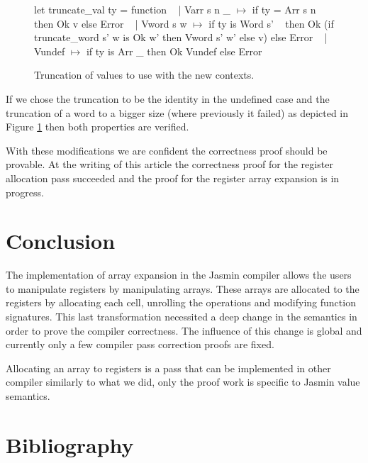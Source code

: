 \documentclass{article}
\begin{document}

\begin{figure}[t]
\obeylines\obeyspaces\ttfamily%
let truncate\_val ty = function
~ | Varr s n \_ \(\mapsto\) if ty = Arr s n then Ok v else Error
~ | Vword s w  \(\mapsto\) if ty is Word s'
~   then Ok (if truncate\_word s' w is Ok w' then Vword s' w' else v) else Error
~ | Vundef     \(\mapsto\) if ty is Arr \_ then Ok Vundef else Error
\normalfont%
\caption{Truncation of values to use with the new contexts.}\label{fig:trval}
\end{figure}

If we chose the truncation to be the identity in the undefined case and the
truncation of a word to a bigger size (where previously it failed) as depicted
in Figure \ref{fig:trval} then both properties are verified.

\medskip

With these modifications we are confident the correctness proof should be
provable. At the writing of this article the correctness proof for the register
allocation pass succeeded and the proof for the register array expansion is in
progress.

\section{Conclusion}\label{sec:ccl} %

The implementation of array expansion in the Jasmin compiler allows the users to
manipulate registers by manipulating arrays. These arrays are allocated to the
registers by allocating each cell, unrolling the operations and modifying
function signatures. This last transformation necessited a deep change in the
semantics in order to prove the compiler correctness. The influence of this
change is global and currently only a few compiler pass correction proofs are
fixed.

Allocating an array to registers is a pass that can be implemented in other
compiler similarly to what we did, only the proof work is specific to Jasmin
value semantics.

\section{Bibliography}


\end{document}
